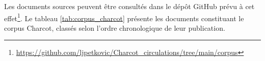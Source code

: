 \begin{table}[h]
	\small
	\centering
	\caption{Description de notre corpus d'étude.}
	\label{tab:corpus}
\end{table}

Les documents sources peuvent être consultés dans le dépôt GitHub prévu à cet effet\footnote{\url{https://github.com/ljpetkovic/Charcot_circulations/tree/main/corpus}}. Le tableau \ref{tab:corpus_charcot} présente les documents constituant le corpus Charcot, classés selon l'ordre chronologique de leur publication.
	
\begingroup
\renewcommand{\arraystretch}{1.5}  %

